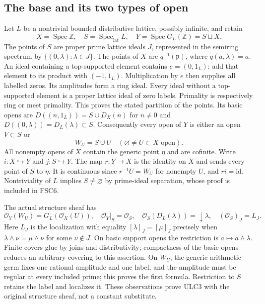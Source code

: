 \subsection{The base and its two types of open}
Let $L$ be a nontrivial bounded distributive lattice, possibly infinite,
and retain
\begin{equation}\tag{ULC1}
 X=\operatorname{Spec}\mathbb Z,\quad
 S=\operatorname{Spec}_{\mathrm{lat}}L,\quad
 Y=\operatorname{Spec}G_L(\mathbb Z)=S\sqcup X.
\end{equation}
The points of $S$ are proper prime lattice ideals $J$, represented in
the semiring spectrum by $\{(0,\lambda):\lambda\in J\}$. The points
of $X$ are $q^{-1}(\mathfrak p)$, where $q(a,\lambda)=a$.
An ideal containing a top-supported element contains $e=(0,1_L)$:
add that element to its product with $(-1,1_L)$. Multiplication by
$e$ then supplies all labelled zeros. Its amplitudes form a ring
ideal. Every ideal without a top-supported element is a proper lattice
ideal of zero labels. Primality is respectively ring or meet primality.
This proves the stated partition of the points. Its basic opens are
$D((n,1_L))=S\cup D_X(n)$ for $n\ne0$ and
$D((0,\lambda))=D_L(\lambda)\subset S$.
Consequently every open of $Y$ is either an open $V\subset S$ or
\begin{equation}\tag{ULC2}
 W_U=S\cup U\quad(\varnothing\ne U\subset X\text{ open}).
\end{equation}
All nonempty opens of $X$ contain the generic point $\eta$ and are
cofinite. Write $i:X\hookrightarrow Y$ and $j:S\hookrightarrow Y$.
The map $r:Y\to X$ is the identity on $X$ and sends every point of
$S$ to $\eta$. It is continuous since $r^{-1}U=W_U$ for nonempty
$U$, and $ri=\mathrm{id}$. Nontriviality of $L$ implies $S\ne\varnothing$
by prime-ideal separation, whose proof is included in FSC6.

The actual structure sheaf has
\begin{equation}\tag{ULC3}
 \mathcal O_Y(W_U)=G_L(\mathcal O_X(U)),\quad
 \mathcal O_Y|_S=\mathcal O_S,\quad
 \mathcal O_S(D_L(\lambda))=\downarrow\lambda,\quad
 (\mathcal O_S)_J=L_J.
\end{equation}
Here $L_J$ is the localization with equality
$[\lambda]_J=[\mu]_J$ precisely when
$\lambda\wedge\nu=\mu\wedge\nu$ for some $\nu\notin J$.
On basic support opens the restriction is $a\mapsto a\wedge\lambda$.
Finite covers glue by joins and distributivity; compactness of the
basic opens reduces an arbitrary covering to this assertion.
On $W_U$, the generic arithmetic germ fixes one rational amplitude
and one label, and the amplitude must be regular at every included
prime; this proves the first formula. Restriction to $S$ retains
the label and localizes it. These observations prove ULC3 with the
original structure sheaf, not a constant substitute.

